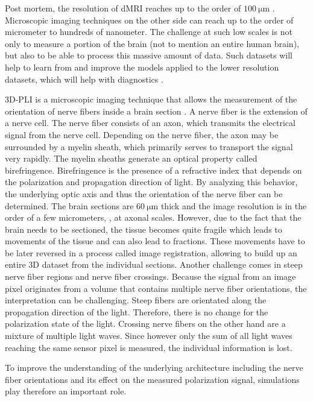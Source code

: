 Post mortem, the resolution of \ac{dMRI} reaches up to the order of $\SI{100}{\micro\meter}$ \cite{beaujoin:hal-02876136}.
Microscopic imaging techniques on the other side can reach up to the order of micrometer to hundreds of nanometer.
The challenge at such low scales is not only to measure a portion of the brain (not to mention an entire human brain), but also to be able to process this massive amount of data.
Such datasets will help to learn from and improve the models applied to the lower resolution datasets, which will help with \eg{} diagnostics \cite{Yendiki2021}.
\par
%
\ac{3D-PLI} is a microscopic imaging technique that allows the measurement of the orientation of nerve fibers inside a brain section \cite{Axer2011a, Axer2011, Axer2016}.
A nerve fiber is the extension of a nerve cell.
The nerve fiber consists of an axon, which transmits the electrical signal from the nerve cell.
Depending on the nerve fiber, the axon may be surrounded by a myelin sheath, which primarily serves to transport the signal very rapidly.
The myelin sheaths generate an optical property called birefringence.
Birefringence is the presence of a refractive index that depends on the polarization and propagation direction of light.
By analyzing this behavior, the underlying optic axis and thus the orientation of the nerve fiber can be determined.
The brain sections are $\SI{60}{\micro\meter}$ thick and the image resolution is in the order of a few micrometers, \ie{}, at axonal scales.
However, due to the fact that the brain needs to be sectioned, the tissue becomes quite fragile which leads to movements of the tissue and can also lead to fractions.
These movements have to be later reversed in a process called image registration, allowing to build up an entire 3D dataset from the individual sections.
Another challenge comes in steep nerve fiber regions and nerve fiber crossings.
Because the signal from an image pixel originates from a volume that contains multiple nerve fiber orientations, the interpretation can be challenging.
Steep fibers are \eg{} orientated along the propagation direction of the light.
Therefore, there is no change for the polarization state of the light.
Crossing nerve fibers on the other hand are a mixture of multiple light waves.
Since however only the sum of all light waves reaching the same sensor pixel is measured, the individual information is lost.
\par
%
To improve the understanding of the underlying architecture including the nerve fiber orientations and its effect on the measured polarization signal, simulations play therefore an important role.
